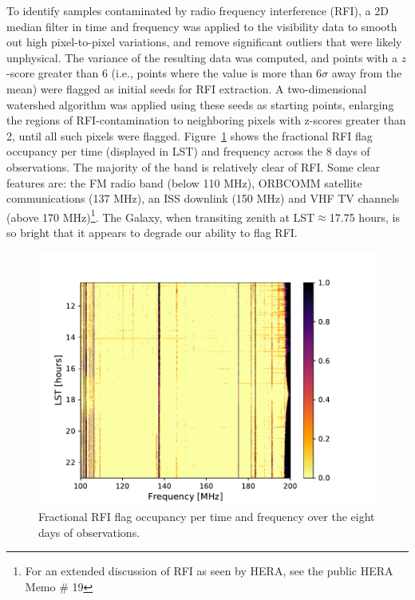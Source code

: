 To identify samples contaminated by radio frequency interference (RFI), a 2D median filter in time and frequency was applied to the visibility data to smooth out high pixel-to-pixel variations, and remove significant outliers that were likely unphysical. The variance of the resulting data was computed, and points with a $z$-score greater than 6 (i.e., points where the value is more than 6$\sigma$ away from the mean) were flagged as initial seeds for RFI extraction. A two-dimensional watershed algorithm was applied using these seeds as starting points, enlarging the regions of RFI-contamination to neighboring pixels with z-scores greater than 2, until all such pixels were flagged. Figure~\ref{fig:hera19_rfi} shows the fractional RFI flag occupancy per time (displayed in LST) and frequency across the 8 days of observations. The majority of the band is relatively clear of RFI. Some clear features are: the FM radio band (below 110 MHz), ORBCOMM satellite communications (137 MHz), an ISS downlink (150 MHz) and VHF TV channels (above 170 MHz)\footnote{For an extended discussion of RFI as seen by HERA, see the public HERA Memo \# 19}.
The Galaxy, when transiting zenith at LST$\approx$17.75 hours, is so bright that it appears to degrade our ability to flag RFI.

\begin{figure}
\centering
\includegraphics[scale=0.6]{chapters/eor_window_HERA/figures/frac_occ.pdf}
\caption{Fractional RFI flag occupancy per time and frequency over the eight days of observations.}
\label{fig:hera19_rfi}
\end{figure}

